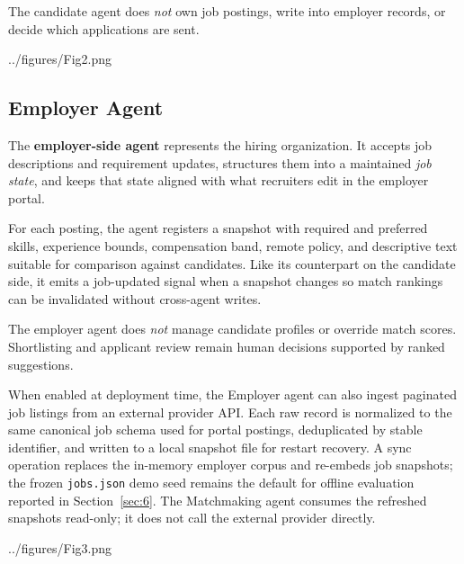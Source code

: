 The candidate agent does \emph{not} own job postings, write into employer records, or decide which applications are sent.

\begin{JFigure}{../figures/Fig2.png}
\vspace{1\baselineskip}
\end{JFigure}

\subsection{Employer Agent}\label{sec:3-employer}

The \textbf{employer-side agent} represents the hiring organization.
It accepts job descriptions and requirement updates, structures them into a maintained \emph{job state}, and keeps that state aligned with what recruiters edit in the employer portal.

For each posting, the agent registers a snapshot with required and preferred skills, experience bounds, compensation band, remote policy, and descriptive text suitable for comparison against candidates.
Like its counterpart on the candidate side, it emits a job-updated signal when a snapshot changes so match rankings can be invalidated without cross-agent writes.

The employer agent does \emph{not} manage candidate profiles or override match scores.
Shortlisting and applicant review remain human decisions supported by ranked suggestions.

When enabled at deployment time, the Employer agent can also ingest paginated job listings from an external provider API.
Each raw record is normalized to the same canonical job schema used for portal postings, deduplicated by stable identifier, and written to a local snapshot file for restart recovery.
A sync operation replaces the in-memory employer corpus and re-embeds job snapshots; the frozen \texttt{jobs.json} demo seed remains the default for offline evaluation reported in Section~\ref{sec:6}.
The Matchmaking agent consumes the refreshed snapshots read-only; it does not call the external provider directly.

\begin{JFigure}{../figures/Fig3.png}
\vspace{1\baselineskip}
\end{JFigure}

